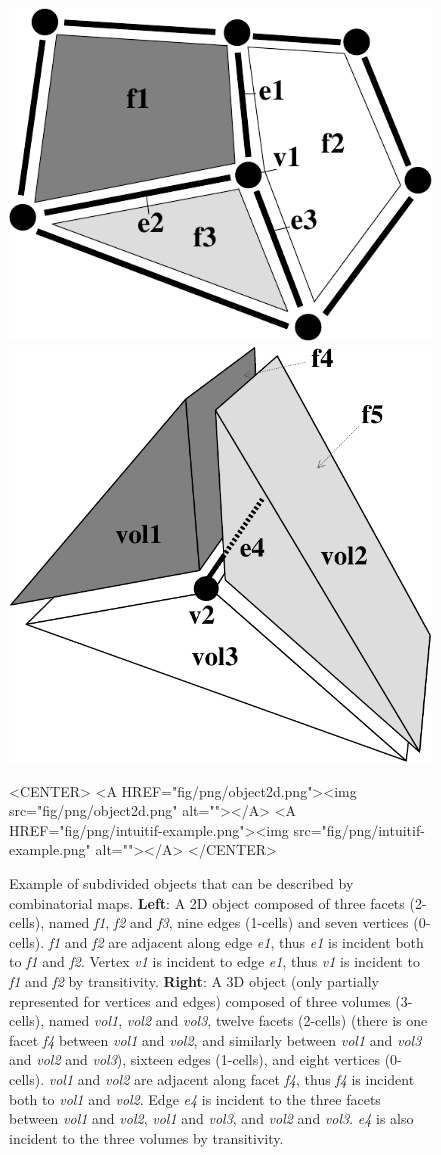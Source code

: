 \begin{figure}[ht]
  \begin{ccTexOnly}
    \begin{center}
      \includegraphics[width=.3\textwidth]
      {Combinatorial_map/fig/pdf/object2d}
      \qquad
      \includegraphics[width=.4\textwidth]
      {Combinatorial_map/fig/pdf/intuitif-example}
    \end{center}
  \end{ccTexOnly}
  \begin{ccHtmlOnly}
    <CENTER>
    <A HREF="fig/png/object2d.png"><img src="fig/png/object2d.png" alt=""></A>
    <A HREF="fig/png/intuitif-example.png"><img src="fig/png/intuitif-example.png" alt=""></A>
    </CENTER>
    \end{ccHtmlOnly}
    \caption{Example of subdivided objects that can be described by
      combinatorial maps.  \textbf{Left}: A 2D object composed of
      three facets (2-cells), named \emph{f1}, \emph{f2} and \emph{f3}, nine
      edges (1-cells) and seven vertices (0-cells).  \emph{f1} and
      \emph{f2} are adjacent along edge \emph{e1}, thus \emph{e1} is incident both
      to \emph{f1} and \emph{f2}. Vertex \emph{v1} is incident to edge \emph{e1}, thus
      \emph{v1} is incident to \emph{f1} and \emph{f2} by transitivity.
      \textbf{Right}: A 3D object (only partially represented for vertices and edges)
      composed of three volumes (3-cells), named \emph{vol1}, \emph{vol2}
      and \emph{vol3}, twelve facets (2-cells) (there is one facet
      \emph{f4} between \emph{vol1} and \emph{vol2}, and similarly between \emph{vol1}
      and \emph{vol3} and \emph{vol2} and \emph{vol3}), sixteen edges (1-cells),
      and eight vertices (0-cells). \emph{vol1} and \emph{vol2} are adjacent
      along facet \emph{f4}, thus \emph{f4} is incident both to \emph{vol1} and
      \emph{vol2}. Edge \emph{e4} is incident to the three facets between
      \emph{vol1} and \emph{vol2}, \emph{vol1} and \emph{vol3}, and \emph{vol2} and
      \emph{vol3}.  \emph{e4} is also incident to the three volumes by
      transitivity.}
    \label{fig-exemple-3Dmanifold}
\end{figure}

